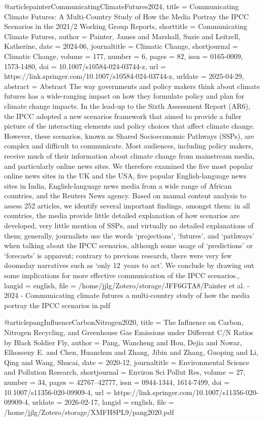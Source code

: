{{{{@article{painterCommunicatingClimateFutures2024,
  title = {Communicating Climate Futures: A Multi-Country Study of How the Media Portray the {{IPCC}} Scenarios in the 2021/2 {{Working Group}} Reports},
  shorttitle = {Communicating Climate Futures},
  author = {Painter, James and Marshall, Suzie and Leitzell, Katherine},
  date = {2024-06},
  journaltitle = {Climatic Change},
  shortjournal = {Climatic Change},
  volume = {177},
  number = {6},
  pages = {82},
  issn = {0165-0009, 1573-1480},
  doi = {10.1007/s10584-024-03744-z},
  url = {https://link.springer.com/10.1007/s10584-024-03744-z},
  urldate = {2025-04-29},
  abstract = {Abstract             The way governments and policy makers think about climate futures has a wide-ranging impact on how they formulate policy and plan for climate change impacts. In the lead-up to the Sixth Assessment Report (AR6), the IPCC adopted a new scenarios framework that aimed to provide a fuller picture of the interacting elements and policy choices that affect climate change. However, these scenarios, known as Shared Socioeconomic Pathways (SSPs), are complex and difficult to communicate. Most audiences, including policy makers, receive much of their information about climate change from mainstream media, and particularly online news sites. We therefore examined the five most popular online news sites in the UK and the USA, five popular English-language news sites in India, English-language news media from a wide range of African countries, and the Reuters News agency. Based on manual content analysis to assess 252 articles, we identify several important findings, amongst them: in all countries, the media provide little detailed explanation of how scenarios are developed, very little mention of SSPs, and virtually no detailed explanations of them; generally, journalists use the words ‘projections’, ‘futures’, and ‘pathways’ when talking about the IPCC scenarios, although some usage of ‘predictions’ or ‘forecasts’ is apparent; contrary to previous research, there were very few doomsday narratives such as ‘only 12~years to act’. We conclude by drawing out some implications for more effective communication of the IPCC scenarios.},
  langid = {english},
  file = {/home/jjlg/Zotero/storage/JFF6GTA8/Painter et al. - 2024 - Communicating climate futures a multi-country study of how the media portray the IPCC scenarios in.pdf}
}

@article{pangInfluenceCarbonNitrogen2020,
  title = {The Influence on Carbon, Nitrogen Recycling, and Greenhouse Gas Emissions under Different {{C}}/{{N}} Ratios by Black Soldier Fly},
  author = {Pang, Wancheng and Hou, Dejia and Nowar, Elhosseny E. and Chen, Huanchun and Zhang, Jibin and Zhang, Guoping and Li, Qing and Wang, Shucai},
  date = {2020-12},
  journaltitle = {Environmental Science and Pollution Research},
  shortjournal = {Environ Sci Pollut Res},
  volume = {27},
  number = {34},
  pages = {42767--42777},
  issn = {0944-1344, 1614-7499},
  doi = {10.1007/s11356-020-09909-4},
  url = {https://link.springer.com/10.1007/s11356-020-09909-4},
  urldate = {2026-02-17},
  langid = {english},
  file = {/home/jjlg/Zotero/storage/XMFH8PL9/pang2020.pdf}
}

}}}}
